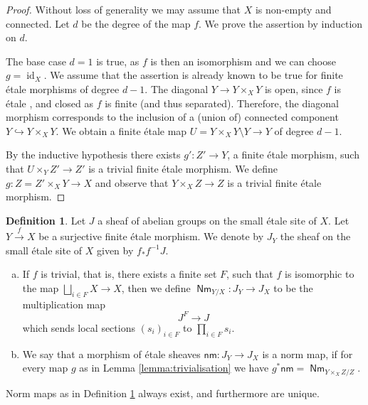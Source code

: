 \documentclass{article}
\DeclareMathOperator{\id}{id}
\DeclareMathOperator{\Nm}{\mathsf{Nm}}
\theoremstyle{definition}
\newtheorem{definition}{Definition}[section]
\theoremstyle{plain}
\begin{document}
\begin{proof}
Without loss of generality we may assume that $X$ is non-empty and connected. Let $d$ be the degree of the map $f$. We prove the assertion by induction on $d$.

The base case $d = 1$ is true, as $f$ is then an isomorphism and we can choose $g=\id_X$. We assume that the assertion is already known to be true for finite \'etale morphisms of degree $d-1$. The diagonal $Y \to Y \times_X Y$ is open, since $f$ is \'etale \cite[Tag 02GE]{stacks-project}, and closed as $f$ is finite (and thus separated). Therefore, the diagonal morphism corresponds to the inclusion of a (union of) connected component $Y \hookrightarrow Y \times_X Y$. We obtain a finite \'etale map $U= Y \times_X Y \setminus Y \to Y$ of degree $d-1$.

By the inductive hypothesis there exists $g'\colon Z' \to Y$, a finite \'etale morphism, such that $U \times_Y Z' \to Z'$ is a trivial finite \'etale morphism. We define $g\colon Z=Z' \times_X Y \to X$ and observe that $Y \times_X Z \to Z$ is a trivial finite \'etale morphism.
\end{proof}

\begin{definition}\label{defi:norm}
Let $J$ a sheaf of abelian groups on the small \'etale site of $X$. Let $Y \xrightarrow{f} X$ be a surjective finite \'etale morphism. We denote by $J_Y$ the sheaf on the small \'etale site of $X$ given by $f_* f^{-1}J$.
\begin{enumerate}[(a)]
\item If $f$ is trivial, that is, there exists a finite set $F$, such that $f$ is isomorphic to the map $\bigsqcup_{i \in F} X \to X$, then we define $\Nm_{Y/X}\colon J_Y \to J_X$ to be the multiplication map
$$J^F \to J$$
which sends local sections $(s_i)_{i \in F}$ to $\prod_{i \in F} s_i$.
\item We say that a morphism of \'etale sheaves $\mathsf{nm}\colon J_Y \to J_X$ is a norm map, if for every map $g$ as in Lemma \ref{lemma:trivialisation} we have $g^*\mathsf{nm} = \Nm_{Y \times_X Z / Z}$.
\end{enumerate}
\end{definition}

Norm maps as in Definition \ref{defi:norm} always exist, and furthermore are unique.
\end{document}
